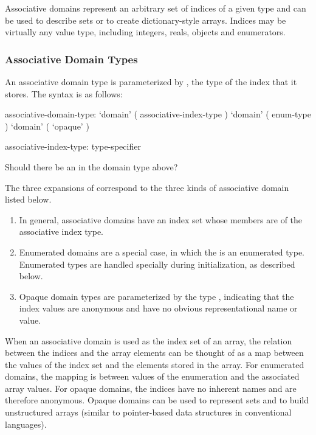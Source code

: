 Associative domains represent an arbitrary set of indices
of a given type and can be used to describe sets or to create
dictionary-style arrays.  Indices may be virtually any value type, including
integers, reals, objects and enumerators.

\subsubsection{Associative Domain Types}

\label{Associative_Domain_Types}

An associative domain type is parameterized by , the
type of the index that it stores.  The syntax is as follows:

\begin{syntax}
associative-domain-type:
  `domain' ( associative-index-type )
  `domain' ( enum-type )
  `domain' ( `opaque' )

associative-index-type:
  type-specifier
\end{syntax}

\begin{openissue}
Should there be an  in the domain type above?
\end{openissue}

The three expansions of  correspond to the three
kinds of associative domain listed below.
\begin{enumerate} 
\item In general, associative domains have an index set whose members are of the
associative index type.  
\item Enumerated domains are a special case, in which
the  is an enumerated type.  Enumerated types are
handled specially during initialization, as described below.
\item Opaque domain types are parameterized by the type ,
indicating that the index values are anonymous and have no obvious
representational name or value.  
\end{enumerate}

When an associative domain is used as the index set of an array, the relation
between the indices and the array elements can be thought of as a map between
the values of the index set and the elements stored in the array.
For enumerated domains, the mapping is between values of the enumeration and
the associated array values.  For opaque domains, the
indices have no inherent names and are therefore anonymous.  Opaque domains can
be used to represent sets and to build unstructured arrays (similar to
pointer-based data structures in conventional languages).

